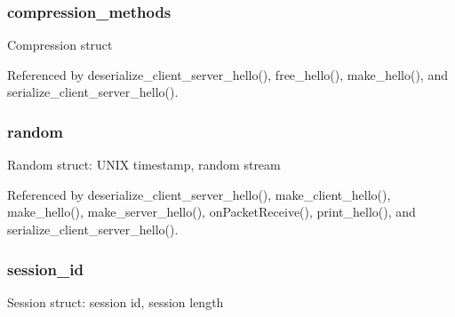 \subsubsection[{\texorpdfstring{compression\+\_\+methods}{compression_methods}}]{ compression\+\_\+methods}\hypertarget{structserver__client__hello__t_a08a470f144044c5ea244590f9ead8165}{}\label{structserver__client__hello__t_a08a470f144044c5ea244590f9ead8165}
Compression struct 

Referenced by deserialize\+\_\+client\+\_\+server\+\_\+hello(), free\+\_\+hello(), make\+\_\+hello(), and serialize\+\_\+client\+\_\+server\+\_\+hello().

\subsubsection[{\texorpdfstring{random}{random}}]{ random}\hypertarget{structserver__client__hello__t_aefaae3d96978baaa21b9445a5728b4fe}{}\label{structserver__client__hello__t_aefaae3d96978baaa21b9445a5728b4fe}
Random struct\+: U\+N\+IX timestamp, random stream 

Referenced by deserialize\+\_\+client\+\_\+server\+\_\+hello(), make\+\_\+client\+\_\+hello(), make\+\_\+hello(), make\+\_\+server\+\_\+hello(), on\+Packet\+Receive(), print\+\_\+hello(), and serialize\+\_\+client\+\_\+server\+\_\+hello().

\subsubsection[{\texorpdfstring{session\+\_\+id}{session_id}}]{ session\+\_\+id}\hypertarget{structserver__client__hello__t_a74379b0c9faddd3c3481e648a4ba2356}{}\label{structserver__client__hello__t_a74379b0c9faddd3c3481e648a4ba2356}
Session struct\+: session id, session length 

